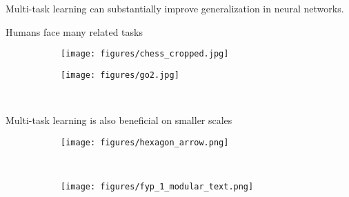 \documentclass{beamer}
\begin{document}
\begin{frame}[standout]
Multi-task learning can substantially improve generalization in neural networks.\par
\end{frame}

\begin{frame}{Humans face many related tasks}
\begin{figure}
\centering
\begin{subfigure}{0.4\textwidth}
\texttt{[image: figures/chess\_cropped.jpg]}
\end{subfigure}%
\begin{subfigure}{0.4\textwidth}
\texttt{[image: figures/go2.jpg]}
\end{subfigure}\\
\end{figure}
\end{frame}

\begin{frame}{Multi-task learning is also beneficial on smaller scales}
\begin{figure}
\vspace{2em}
\centering
\begin{subfigure}{0.3\textwidth}
\texttt{[image: figures/hexagon\_arrow.png]}
\end{subfigure}~
\begin{subfigure}{0.65\textwidth}
\texttt{[image: figures/fyp\_1\_modular\_text.png]}
\end{subfigure}
\vspace{2em}
\end{figure}
{
\scriptsize
\citep{Lampinen2017b}
}
\end{frame}
\end{document}
